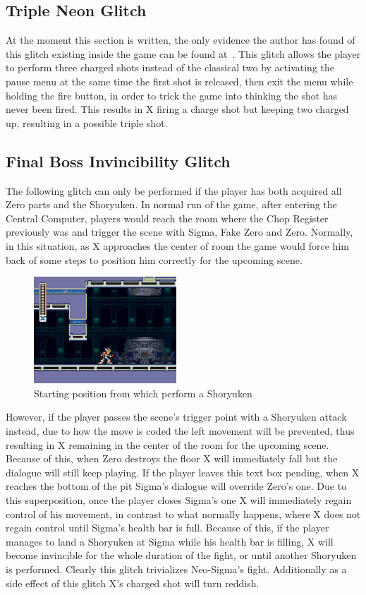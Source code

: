 \subsection{Triple Neon Glitch}
At the moment this section is written, the only evidence the author has found of this glitch existing inside the game can be found at~\cite{video:triple_glitch}. This glitch allows the player to perform three charged shots instead of the classical two by activating the pause menu at the same time the first shot is released, then exit the menu while holding the fire button, in order to trick the game into thinking the shot has never been fired. This results in X firing a charge shot but keeping two charged up, resulting in a possible triple shot.

\subsection{Final Boss Invincibility Glitch}\label{Final_battle_glitch}
The following glitch can only be performed if the player has both acquired all Zero parts and the Shoryuken. In normal run of the game, after entering the Central Computer, players would reach the room where the Chop Register previously was and trigger the scene with Sigma, Fake Zero and Zero. Normally, in this situation, as X approaches the center of room the game would force him back of some steps to position him correctly for the upcoming scene. 
\begin{figure}[htp]
	\centering
	\includegraphics[height=4cm]{figures/X2/Miscs/Sigma_glitch_start.png}
	\caption{Starting position from which perform a Shoryuken}
	\label{X2_sigma_glitch_start}
\end{figure}
However, if the player passes the scene's trigger point with a Shoryuken attack instead, due to how the move is coded the left movement will be prevented, thus resulting in X remaining in the center of the room for the upcoming scene. Because of this, when Zero destroys the floor X will immediately fall but the dialogue will still keep playing. If the player leaves this text box pending, when X reaches the bottom of the pit Sigma's dialogue will override Zero's one. Due to this superposition, once the player closes Sigma's one X will immediately regain control of his movement, in contrast to what normally happens, where X does not regain control until Sigma's health bar is full. Because of this, if the player manages to land a Shoryuken at Sigma while his health bar is filling, X will become invincible for the whole duration of the fight, or until another Shoryuken is performed. Clearly this glitch trivializes Neo-Sigma's fight. Additionally as a side effect of this glitch X's charged shot will turn reddish.

